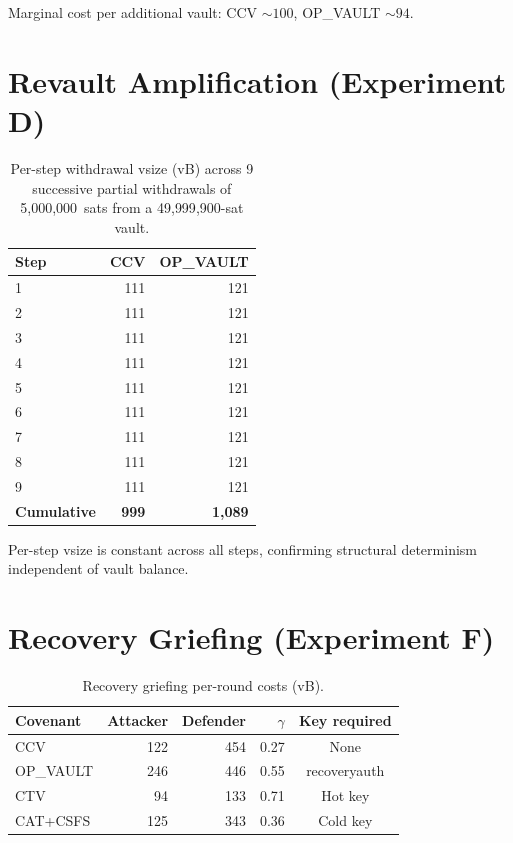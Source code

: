 Marginal cost per additional vault: CCV ${\sim}100$\vB{}, OP\_VAULT ${\sim}94$\vB{}.

\section{Revault Amplification (Experiment D)}

\begin{table}[h]
\centering
\caption{Per-step withdrawal vsize (vB) across 9 successive partial withdrawals
of 5{,}000{,}000~sats from a 49{,}999{,}900-sat vault.}
\label{tab:app_revault}
\begin{tabular}{@{}lrr@{}}
\toprule
Step & CCV & OP\_VAULT \\
\midrule
1 & 111 & 121 \\
2 & 111 & 121 \\
3 & 111 & 121 \\
4 & 111 & 121 \\
5 & 111 & 121 \\
6 & 111 & 121 \\
7 & 111 & 121 \\
8 & 111 & 121 \\
9 & 111 & 121 \\
\midrule
\textbf{Cumulative} & \textbf{999} & \textbf{1{,}089} \\
\bottomrule
\end{tabular}
\end{table}

Per-step vsize is constant across all steps, confirming structural determinism
independent of vault balance.

\section{Recovery Griefing (Experiment F)}

\begin{table}[h]
\centering
\caption{Recovery griefing per-round costs (vB).}
\label{tab:app_griefing}
\begin{tabular}{@{}lrrrc@{}}
\toprule
Covenant & Attacker & Defender & $\gamma$ & Key required \\
\midrule
CCV       & 122 & 454 & 0.27 & None \\
OP\_VAULT & 246 & 446 & 0.55 & recoveryauth \\
CTV       &  94 & 133 & 0.71 & Hot key \\
CAT+CSFS  & 125 & 343 & 0.36 & Cold key \\
\bottomrule
\end{tabular}
\end{table}

